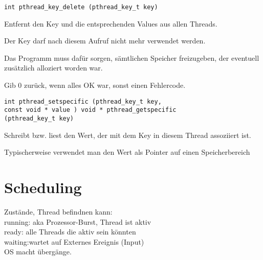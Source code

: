 \begin{multicols*}{5}
	
		\vspace{-5pt}
	
		
	\begin{lstlisting}
int pthread_key_delete (pthread_key_t key)
	\end{lstlisting}
	\vspace{-5pt} 
	\begin{compactitem} [$\bullet$]
		\item Entfernt den Key und die entsprechenden Values aus allen Threads. 
		\item Der Key darf nach diesem Aufruf nicht mehr verwendet werden. 
		\item Das Programm muss dafür sorgen, sämtlichen Speicher freizugeben, der eventuell zusätzlich alloziert worden war. 
		\item Gib 0 zurück, wenn alles OK war, sonst einen Fehlercode.
	\end{compactitem}

	\vspace{-5pt}


	\begin{lstlisting}
int pthread_setspecific (pthread_key_t key,
const void * value ) void * pthread_getspecific 
(pthread_key_t key)
	\end{lstlisting}
	\vspace{-5pt}
		\begin{compactitem}[$\bullet$]
			\item Schreibt bzw. liest den Wert, der mit dem Key in diesem Thread assoziiert ist. 
			\item Typischerweise verwendet man den Wert als Pointer auf einen Speicherbereich
		\end{compactitem}
				


\section{Scheduling}
	Zustände, Thread befindnen kann:\\
	\textcolor{h}{running:} aka Prozessor-Burst, Thread ist aktiv\\
	\textcolor{h}{ready:} alle Threads die aktiv sein könnten\\
	\textcolor{h}{waiting:}wartet auf Externes Ereignis (Input)\\
	OS macht übergänge.
	
	\vspace{-2pt}
	\drule{\linewidth}{1pt}


\end{multicols*}
